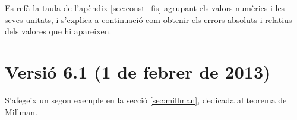 Es ref\`{a} la taula de l'ap\`{e}ndix \ref{sec:const_fis} agrupant els valors num\`{e}rics i les seves unitats, i s'explica a continuaci\'{o} com obtenir els errors absoluts i relatius dels valores que hi apareixen.

\section*{Versi\'{o} 6.1 (1 de febrer de 2013)}

S'afegeix un segon exemple en la secci\'{o} \ref{sec:millman}, dedicada al teorema de Millman.
